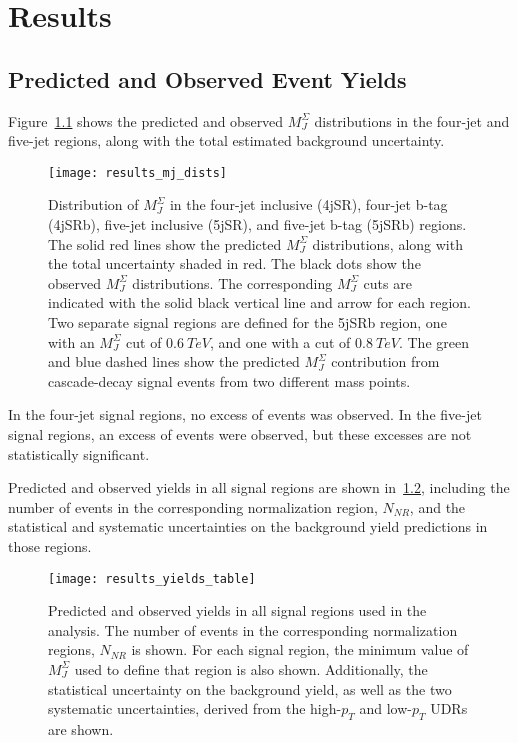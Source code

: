 \chapter{Results} \label{ch:results}

\section{Predicted and Observed Event Yields}\label{sec:results_yields}

Figure~\ref{fig:results_mj_dists} shows the predicted and observed $M_J^{\Sigma}$ distributions in the
four-jet and five-jet regions, along with the total estimated background uncertainty.

\begin{figure}[!ht]
    \centering
\texttt{[image: results\_mj\_dists]}
\caption{Distribution of $M_J^{\Sigma}$ in the four-jet inclusive (4jSR), four-jet b-tag (4jSRb), five-jet inclusive
(5jSR), and five-jet b-tag (5jSRb) regions.
The solid red lines show the predicted $M_J^{\Sigma}$ distributions, along with the total uncertainty shaded in red.
The black dots show the observed $M_J^{\Sigma}$ distributions.
The corresponding $M_J^{\Sigma}$ cuts are indicated with the solid black vertical line and arrow for each region.
Two separate signal regions are defined for the 5jSRb region, one with an $M_J^{\Sigma}$ cut of $0.6~TeV$,
and one with a cut of $0.8~TeV$.
The green and blue dashed lines show the predicted $M_J^{\Sigma}$ contribution from cascade-decay signal events
from two different mass points.
}
\label{fig:results_mj_dists}
\end{figure}

In the four-jet signal regions, no excess of events was observed.
In the five-jet signal regions, an excess of events were observed, but these excesses are not statistically
significant.

Predicted and observed yields in all signal regions are shown in~\ref{fig:results_yields_table},
including the number of events in the corresponding normalization region, $N_{NR}$, and the statistical and systematic
uncertainties on the background yield predictions in those regions.

\begin{figure}[!ht]
    \centering
\texttt{[image: results\_yields\_table]}
\caption{Predicted and observed yields in all signal regions used in the analysis.
The number of events in the corresponding normalization regions, $N_{NR}$ is shown.
For each signal region, the minimum value of $M_J^{\Sigma}$ used to define that region is also shown.
Additionally, the statistical uncertainty on the background yield, as well as the two systematic uncertainties,
derived from the high-$p_T$ and low-$p_T$ UDRs are shown.}
\label{fig:results_yields_table}
\end{figure}

